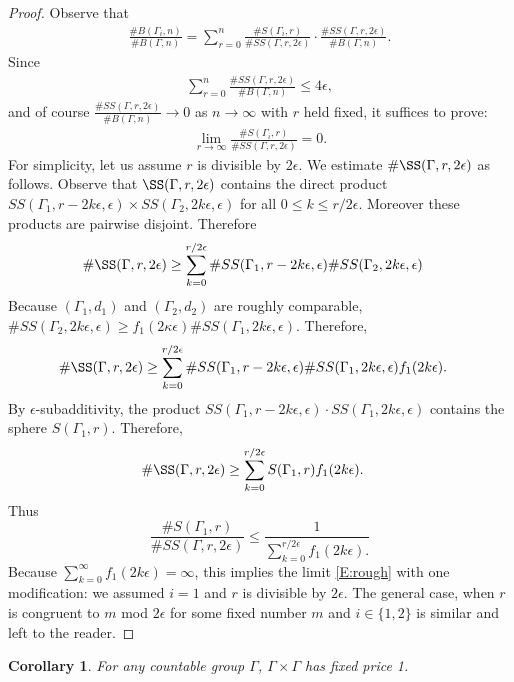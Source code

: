 \documentclass[12pt]{article}
\theoremstyle{plain}
\newtheorem{cor}[thm]{Corollary}
\theoremstyle{definition}
\theoremstyle{remark}
\newcommand{\G}{\Gamma}
\newcommand{\eps}{\epsilon}
\renewcommand\k{\kappa}
\begin{document}
\begin{proof}
Observe that
\begin{align*}
    \frac{\#B(\G_i,n)}{\#B(\G,n)} = \sum_{r=0}^n \frac{\#S(\G_i,r)}{\#SS(\G,r,2\eps)}\cdot  \frac{\#SS(\G,r,2\eps)}{\#B(\G,n)}.
\end{align*}
Since 
\begin{align*}
  \sum_{r=0}^n \frac{\#SS(\G,r,2\eps)}{\#B(\G,n)}\le 4\eps,
\end{align*}
and of course $\frac{\#SS(\G,r,2\eps)}{\#B(\G,n)} \to 0$ as $n\to\infty$ with $r$ held fixed, it suffices to prove:
\begin{align}\label{E:rough}
   \lim_{r\to\infty} \frac{\#S(\G_i,r)}{\#SS(\G,r,2\eps)} = 0.
\end{align}
For simplicity, let us assume $r$ is divisible by $2\eps$. We estimate $\#\SS(\G,r,2\eps)$ as follows. Observe that $\SS(\G,r,2\eps)$ contains the direct product $SS(\G_1,r-2k\eps,\eps)\times SS(\G_2,2k\eps,\eps)$ for all $0\le k \le r/2\eps$. Moreover these products are pairwise disjoint. Therefore 
\begin{align*}
   \# \SS(\G,r,2\eps) &\ge \sum_{k=0}^{r/2\eps} \#SS(\G_1,r-2k\eps,\eps)\#SS(\G_2,2k\eps,\eps)
\end{align*}
Because $(\G_1,d_1)$ and $(\G_2,d_2)$ are roughly comparable, $\#SS(\G_2,2k\eps,\eps) \ge f_1(2\k\eps)\#SS(\G_1,2k\eps,\eps)$. Therefore,
\begin{align*}
   \# \SS(\G,r,2\eps) &\ge \sum_{k=0}^{r/2\eps} \#SS(\G_1,r-2k\eps,\eps)\#SS(\G_1,2k\eps,\eps)f_1(2k\eps).
\end{align*}
By $\eps$-subadditivity, the product $SS(\G_1,r-2k\eps,\eps)\cdot SS(\G_1,2k\eps,\eps)$ contains the sphere $S(\G_1,r)$. Therefore, 
\begin{align*}
   \# \SS(\G,r,2\eps) &\ge \sum_{k=0}^{r/2\eps} S(\G_1,r)f_1(2k\eps).
\end{align*}
Thus
$$\frac{\#S(\G_1,r)}{\#SS(\G,r,2\eps)} \le \frac{1}{\sum_{k=0}^{r/2\eps} f_1(2k\eps).} $$
Because $\sum_{k=0}^\infty f_1(2k\eps)=\infty$, this implies the limit \eqref{E:rough} with one modification: we assumed $i=1$ and $r$ is divisible by $2\eps$. The general case, when $r$ is congruent to $m$ mod $2\eps$ for some fixed number $m$ and $i\in \{1,2\}$ is similar and left to the reader.
\end{proof}

\begin{cor}
    For any countable group $\G$, $\G\times \G$ has fixed price 1.
\end{cor}
\end{document}
